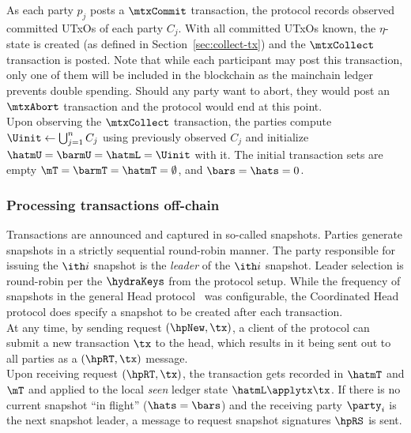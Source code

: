 \quad As each party $p_{j}$ posts a
$\mtxCommit$ transaction, the protocol records observed committed UTxOs of each
party $C_j$. With all committed UTxOs known, the $\eta$-state is created (as
defined in Section~\ref{sec:collect-tx}) and the $\mtxCollect$ transaction is
posted. Note that while each participant may post this transaction, only one of
them will be included in the blockchain as the mainchain ledger prevents double
spending. Should any party want to abort, they would post an $\mtxAbort$
transaction and the protocol would end at this point.\\

\quad Upon observing the $\mtxCollect$
transaction, the parties compute $\Uinit \gets \bigcup_{j=1}^{n} C_j$ using
previously observed $C_j$ and initialize $\hatmU = \barmU = \hatmL = \Uinit$
with it. The initial transaction sets are empty
$\mT = \barmT =\hatmT =\emptyset$, and $\bars = \hats = 0$.

\subsubsection{Processing transactions off-chain}

Transactions are announced and captured in so-called snapshots. Parties generate
snapshots in a strictly sequential round-robin manner. The party responsible for
issuing the $\ith i$ snapshot is the \emph{leader} of the $\ith i$ snapshot.
Leader selection is round-robin per the $\hydraKeys$ from the protocol setup.
While the frequency of snapshots in the general Head protocol~\cite{hydrahead20}
was configurable, the Coordinated Head protocol does specify a snapshot to be
created after each transaction.\\

\quad At any time, by sending request $(\hpNew,\tx)$, a
client of the protocol can submit a new transaction $\tx$ to the head, which
results in it being sent out to all parties as a $(\hpRT,\tx)$ message.\\

\quad Upon receiving request $(\hpRT,\tx)$, the transaction
gets recorded in $\hatmT$ and $\mT$ and applied to the local \emph{seen} ledger state
$\hatmL \applytx \tx$. If there is no current snapshot ``in flight''
($\hats = \bars$) and the receiving party $\party_{i}$ is the next snapshot
leader, a message to request snapshot signatures $\hpRS$ is sent. \\

